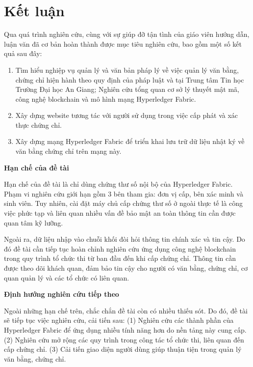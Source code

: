 \chapter{Kết luận}
Qua quá trình nghiên cứu, cùng với sự giúp đỡ tận tình của giáo viên hướng dẫn, luận văn đã cơ bản hoàn thành được mục tiêu nghiên cứu, bao gồm một số kết quả sau đây:

\begin{enumerate}

\item Tìm hiểu nghiệp vụ quản lý và văn bản pháp lý về việc quản lý văn bằng, chứng chỉ hiện hành theo quy định của pháp luật và tại Trung tâm Tin học Trường Đại học An Giang; Nghiên cứu tổng quan cơ sở lý thuyết mật mã, công nghệ blockchain và mô hình mạng Hyperledger Fabric.

\item Xây dựng website tương tác với người sử dụng trong việc cấp phát và xác thực chứng chỉ.

\item Xây dựng mạng Hyperledger Fabric để triển khai lưu trữ dữ liệu nhật ký về văn bằng chứng chỉ trên mạng này.
\end{enumerate}

\textbf{Hạn chế của đề tài}

Hạn chế của đề tài là chỉ dùng chứng thư số nội bộ của Hyperledger Fabric. Phạm vi nghiên cứu giới hạn gồm 3 bên tham gia: đơn vị cấp, bên xác minh và sinh viên. Tuy nhiên, cài đặt máy chủ cấp chứng thư số ở ngoài thực tế là công việc phức tạp và liên quan nhiều vấn đề bảo mật an toàn thông tin cần được quan tâm kỹ lưỡng.

Ngoài ra, dữ liệu nhập vào chuỗi khối đòi hỏi thông tin chính xác và tin cậy. Do đó đề tài cần tiếp tục hoàn chỉnh nghiên cứu ứng dụng công nghệ blockchain trong quy trình tổ chức thi từ ban đầu đến khi cấp chứng chỉ. Thông tin cần được theo dõi khách quan, đảm bảo tin cậy cho người có văn bằng, chứng chỉ, cơ quan quản lý  và các tổ chức có liên quan.

\textbf{Định hướng nghiên cứu tiếp theo}

Ngoài những hạn chế trên, chắc chắn đề tài còn có nhiều thiếu sót. Do đó, đề tài sẽ tiếp tục việc nghiên cứu, cải tiến sau: (1) Nghiên cứu các thành phần của Hyperledger Fabric để ứng dụng nhiều tính năng hơn do nền tảng này cung cấp.  (2) Nghiên cứu mở rộng các quy trình trong công tác tổ chức thi, liên quan đến cấp chứng chỉ. (3) Cải tiến giao diện người dùng giúp thuận tiện trong quản lý văn bằng, chứng chỉ.
